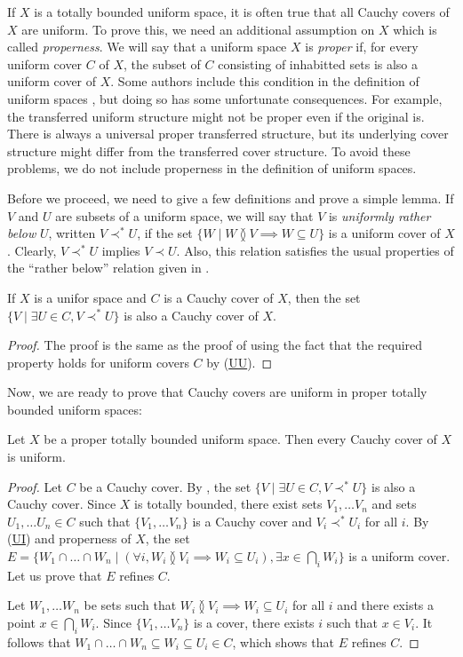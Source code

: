 \documentclass[reqno]{amsart}
\newcommand{\axref}[1]{(\hyperref[ax:#1]{#1})}
\theoremstyle{definition}
\theoremstyle{remark}
\numberwithin{figure}{section}
\newcommand{\overlap}[2]{#1 \between #2}
\newcommand{\rb}{\prec}
\begin{document}
If $X$ is a totally bounded uniform space, it is often true that all Cauchy covers of $X$ are uniform.
To prove this, we need an additional assumption on $X$ which is called \emph{properness}.
We will say that a uniform space $X$ is \emph{proper} if, for every uniform cover $C$ of $X$, the subset of $C$ consisting of inhabitted sets is also a uniform cover of $X$.
Some authors include this condition in the definition of uniform spaces %
, but doing so has some unfortunate consequences.
For example, the transferred uniform structure might not be proper even if the original is.
There is always a universal proper transferred structure, but its underlying cover structure might differ from the transferred cover structure.
To avoid these problems, we do not include properness in the definition of uniform spaces.

Before we proceed, we need to give a few definitions and prove a simple lemma.
If $V$ and $U$ are subsets of a uniform space, we will say that $V$ is \emph{uniformly rather below} $U$,
written $V \rb^* U$, if the set $\{ W \mid \overlap{W}{V} \implies W \subseteq U \}$ is a uniform cover of $X$.
Clearly, $V \rb^* U$ implies $V \rb U$.
Also, this relation satisfies the usual properties of the ``rather below'' relation given in .

\begin{lem}
If $X$ is a unifor space and $C$ is a Cauchy cover of $X$, then the set $\{ V \mid \exists U \in C, V \rb^* U \}$ is also a Cauchy cover of $X$.
\end{lem}
\begin{proof}
The proof is the same as the proof of  using the fact that the required property holds for uniform covers $C$ by \axref{UU}.
\end{proof}

Now, we are ready to prove that Cauchy covers are uniform in proper totally bounded uniform spaces:

\begin{prop}[tb-cauchy]
Let $X$ be a proper totally bounded uniform space.
Then every Cauchy cover of $X$ is uniform.
\end{prop}
\begin{proof}
Let $C$ be a Cauchy cover.
By , the set $\{ V \mid \exists U \in C, V \rb^* U \}$ is also a Cauchy cover.
Since $X$ is totally bounded, there exist sets $V_1, \ldots V_n$ and sets $U_1, \ldots U_n \in C$ such that $\{ V_1, \ldots V_n \}$ is a Cauchy cover and $V_i \rb^* U_i$ for all $i$.
By \axref{UI} and properness of $X$, the set $E = \{ W_1 \cap \ldots \cap W_n \mid (\forall i, \overlap{W_i}{V_i} \implies W_i \subseteq U_i), \exists x \in \bigcap_i W_i \}$ is a uniform cover.
Let us prove that $E$ refines $C$.

Let $W_1, \ldots W_n$ be sets such that $\overlap{W_i}{V_i} \implies W_i \subseteq U_i$ for all $i$ and there exists a point $x \in \bigcap_i W_i$.
Since $\{ V_1, \ldots V_n \}$ is a cover, there exists $i$ such that $x \in V_i$.
It follows that $W_1 \cap \ldots \cap W_n \subseteq W_i \subseteq U_i \in C$, which shows that $E$ refines $C$.
\end{proof}
\end{document}

